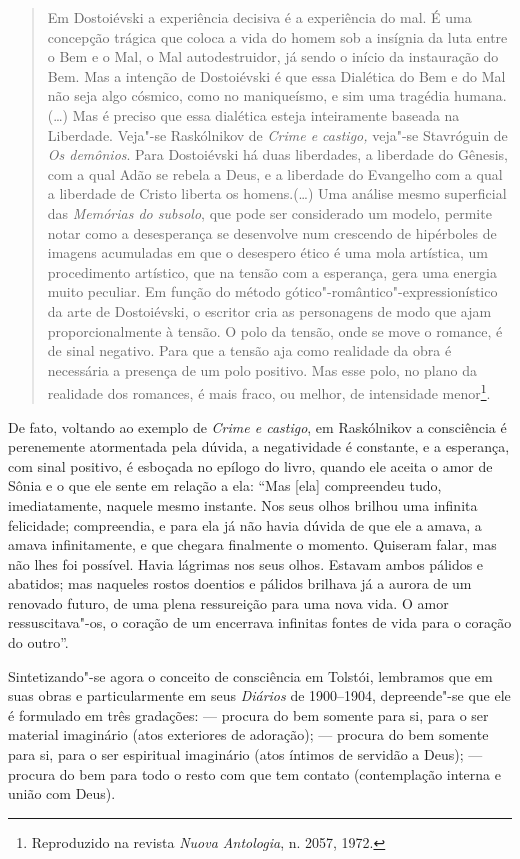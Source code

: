 \begin{quote}
Em Dostoiévski a experiência decisiva é a experiência do mal. É uma
concepção trágica que coloca a vida do homem sob a insígnia da luta
entre o Bem e o Mal, o Mal autodestruidor, já sendo o início da
instauração do Bem. Mas a intenção de Dostoiévski é que essa Dialética
do Bem e do Mal não seja algo cósmico, como no maniqueísmo, e sim uma
tragédia humana. (\ldots{}) Mas é preciso que essa
dialética esteja inteiramente baseada na Liberdade. Veja"-se Raskólnikov
de \emph{Crime e castigo,} veja"-se Stavróguin de \emph{Os
demônios}. Para Dostoiévski há duas liberdades, a liberdade do Gênesis,
com a qual Adão se rebela a Deus, e a liberdade do Evangelho com a qual a
liberdade de Cristo liberta os homens.(\ldots{}) Uma análise mesmo
superficial das \emph{Memórias do subsolo}, que pode ser considerado um
modelo, permite notar como a desesperança se desenvolve num crescendo de
hipérboles de imagens acumuladas em que o desespero ético é uma mola
artística, um procedimento artístico, que na tensão com a esperança,
gera uma energia muito peculiar. Em função do método
gótico"-romântico"-expressionístico da arte de Dostoiévski, o escritor
cria as personagens de modo que ajam proporcionalmente à tensão. O polo
da tensão, onde se move o romance, é de sinal negativo. Para que a
tensão aja como realidade da obra é necessária a presença de um polo
positivo. Mas esse polo, no plano da realidade dos romances, é mais
fraco, ou melhor, de intensidade menor\footnote{Reproduzido na
revista \emph{Nuova Antologia}, n. 2057, 1972.}.
\end{quote}

De fato, voltando ao exemplo de \emph{Crime e castigo}, em Raskólnikov a
consciência é perenemente atormentada pela dúvida, a negatividade é
constante, e a esperança, com sinal positivo, é esboçada no epílogo do
livro, quando ele aceita o amor de Sônia e o que ele sente em relação a
ela: ``Mas [ela] compreendeu tudo, imediatamente, naquele mesmo
instante. Nos seus olhos brilhou uma infinita felicidade; compreendia, e
para ela já não havia dúvida de que ele a amava, a amava infinitamente,
e que chegara finalmente o momento. Quiseram falar, mas não lhes foi possível. Havia lágrimas nos seus
olhos. Estavam ambos pálidos e abatidos; mas naqueles rostos doentios e
pálidos brilhava já a aurora de um renovado futuro, de uma plena
ressureição para uma nova vida. O amor ressuscitava"-os, o coração de um
encerrava infinitas fontes de vida para o coração do outro''.

Sintetizando"-se agora o conceito de consciência em Tolstói, lembramos que em suas
obras e particularmente em seus \emph{Diários} de 1900--1904,
depreende"-se que ele é formulado em três gradações:  --- procura do bem
somente para si, para o ser material imaginário (atos exteriores de
adoração);  --- procura do bem somente para si, para o ser espiritual
imaginário (atos íntimos de servidão a Deus);  --- procura do bem
para todo o resto com que tem contato (contemplação interna e união com Deus).

